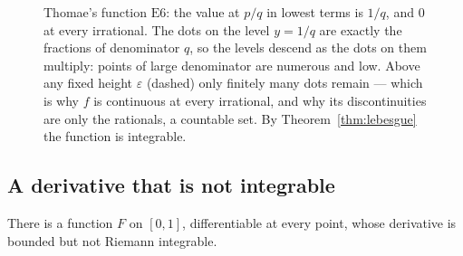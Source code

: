 \begin{figure}[htbp]
\caption{Thomae's function $\mathrm{E}6$: the value at $p/q$ in lowest terms
is $1/q$, and $0$ at every irrational. The dots on the level $y=1/q$ are
exactly the fractions of denominator $q$, so the levels descend as the dots
on them multiply: points of large denominator are numerous and low. Above
any fixed height $\varepsilon$ (dashed) only finitely many dots remain ---
which is why $f$ is continuous at every irrational, and why its
discontinuities are only the rationals, a countable set. By
Theorem~\ref{thm:lebesgue} the function is integrable.}
\label{fig:thomae}
\end{figure}

\subsection{A derivative that is not integrable}

\begin{theorem}[Volterra]\label{thm:volterra}
There is a function $F$ on $[0,1]$, differentiable at every point, whose
derivative is bounded but not Riemann integrable.
\end{theorem}

